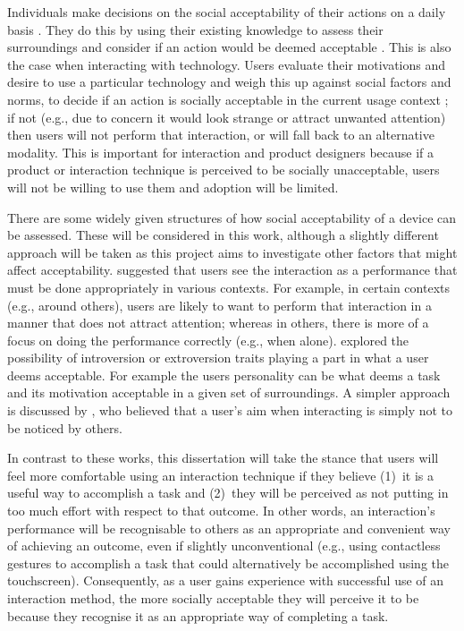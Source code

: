 \documentclass{l4proj}
\begin{document}
Individuals make decisions on the social acceptability of their actions on a daily basis \citep{pohl_focused_2013}. They do this by using their existing knowledge to assess their surroundings and consider if an action would be deemed acceptable \citep{naegele_presentation_1956}. This is also the case when interacting with technology. Users evaluate their motivations and desire to use a particular technology and weigh this up against social factors and norms, to decide if an action is socially acceptable in the current usage context \citep{rico_usable_2010}; if not (e.g., due to concern it would look strange or attract unwanted attention) then users will not perform that interaction, or will fall back to an alternative modality. This is important for interaction and product designers because if a product or interaction technique is perceived to be socially unacceptable, users will not be willing to use them and adoption will be limited.

There are some widely given structures of how social acceptability of a device can be assessed. These will be considered in this work, although a slightly different approach will be taken as this project aims to investigate other factors that might affect acceptability. \citet{rico_usable_2010} suggested that users see the interaction as a performance that must be done appropriately in various contexts. For example, in certain contexts (e.g., around others), users are likely to want to perform that interaction in a manner that does not attract attention; whereas in others, there is more of a focus on doing the performance correctly (e.g., when alone). \citet{ahlstrom_are_2014} explored the possibility of introversion or extroversion traits playing a part in what a user deems acceptable. For example the users personality can be what deems a task and its motivation acceptable in a given set of surroundings. A simpler approach is discussed by \citet{sakamoto_is_2020}, who believed that a user's aim when interacting is simply not to be noticed by others.

In contrast to these works, this dissertation will take the stance that users will feel more comfortable using an interaction technique if they believe (1)~it is a useful way to accomplish a task and (2)~they will be perceived as not putting in too much effort with respect to that outcome. In other words, an interaction's performance will be recognisable to others as an appropriate and convenient way of achieving an outcome, even if slightly unconventional (e.g., using contactless gestures to accomplish a task that could alternatively be accomplished using the touchscreen). Consequently, as a user gains experience with successful use of an interaction method, the more socially acceptable they will perceive it to be because they recognise it as an appropriate way of completing a task.
\end{document}
